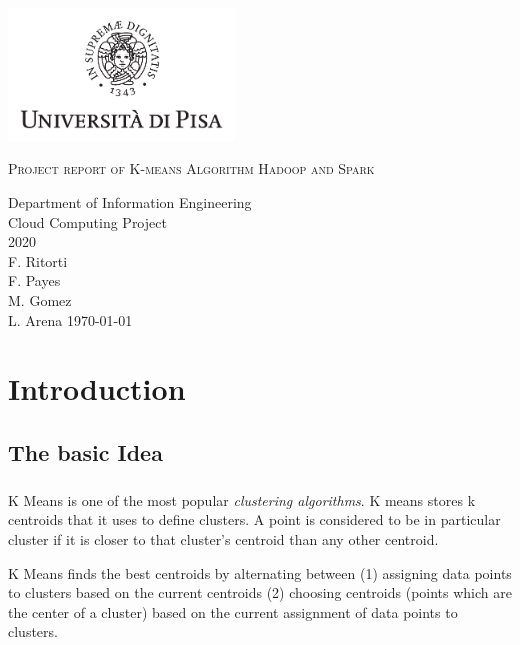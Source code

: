 \documentclass{book}
\author{Fabiana Ritorti - Francisco Payes - Luigi Arena - Marsha Gomez Gomez}
\date{\today}
\begin{document}
    \begin{titlepage}
        \centering
        \includegraphics[width=6cm]{unipi}
        \vfill
        \vspace{1.5cm}
        {\huge\textsc{Project report of K-means Algorithm Hadoop and Spark}\par}
        {\Large
            Department of Information Engineering\\
            Cloud Computing Project\\
            2020\\
            \vspace{5cm}
            F. Ritorti \\  F. Payes \\  M. Gomez\\ L. Arena 
            \vspace{2cm}
            \today
        }    
        \vfill
        \vfill
    \end{titlepage}
    
    \tableofcontents

\hypersetup{
    colorlinks=true,
    linkcolor=blue,
    filecolor=magenta,      
    urlcolor=cyan,
}

\chapter{Introduction}
    \section{The basic Idea}
    \paragraph{}   
	K Means is one of the most popular \textit{clustering algorithms}. K means stores k centroids that it uses to define clusters. A point is considered to be in particular cluster if it is closer to that cluster's centroid than any other centroid. 

 	K Means finds the best centroids by alternating between (1) assigning data points to clusters based on the current centroids (2) choosing centroids (points which are the center of a cluster) based on the current assignment of data points to clusters. 
\end{document}
